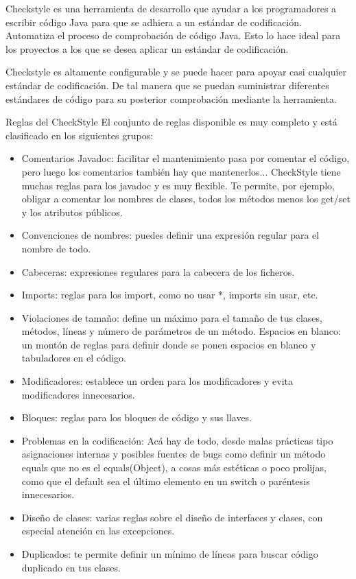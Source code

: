 \documentclass[DIV=calc,paper=a4,fontsize=11pt,onecolumn]{scrartcl} %
\begin{document}
Checkstyle es una herramienta de desarrollo que ayudar a los programadores a escribir código Java para que se adhiera a un estándar de codificación. Automatiza el proceso de comprobación de código Java. Esto lo hace ideal para los proyectos a los que se desea aplicar un estándar de codificación.

Checkstyle es altamente configurable y se puede hacer para apoyar casi cualquier estándar de codificación. De tal manera que se puedan suministrar diferentes estándares de código para su posterior comprobación mediante la herramienta.

Reglas del CheckStyle
El conjunto de reglas disponible es muy completo y está clasificado en los siguientes grupos:
\begin{itemize}
	\item Comentarios Javadoc: facilitar el mantenimiento pasa por comentar el código, pero luego los comentarios también hay que mantenerlos... CheckStyle tiene muchas reglas para los javadoc y es muy flexible. Te permite, por ejemplo, obligar a comentar los nombres de clases, todos los métodos menos los get/set y los atributos públicos.
	\item Convenciones de nombres: puedes definir una expresión regular para el nombre de todo. 
	\item 	Cabeceras: expresiones regulares para la cabecera de los ficheros.
	\item Imports: reglas para los import, como no usar *, imports sin usar, etc.
	\item Violaciones de tamaño: define un máximo para el tamaño de tus clases, métodos, líneas y número de parámetros de un método.
	Espacios en blanco: un montón de reglas para definir donde se ponen espacios en blanco y tabuladores en el código.
	\item Modificadores: establece un orden para los modificadores y evita modificadores innecesarios.
	\item Bloques: reglas para los bloques de código y sus llaves.
	\item Problemas en la codificación: Acá hay de todo, desde malas prácticas tipo asignaciones internas y posibles fuentes de bugs como definir un método equals que no es el equals(Object), a cosas más estéticas o poco prolijas, como que el default sea el último elemento en un switch o paréntesis innecesarios.
	\item Diseño de clases: varias reglas sobre el diseño de interfaces y clases, con especial atención en las excepciones.
	\item Duplicados: te permite definir un mínimo de líneas para buscar código duplicado en tus clases.

\end{itemize}
\end{document}
